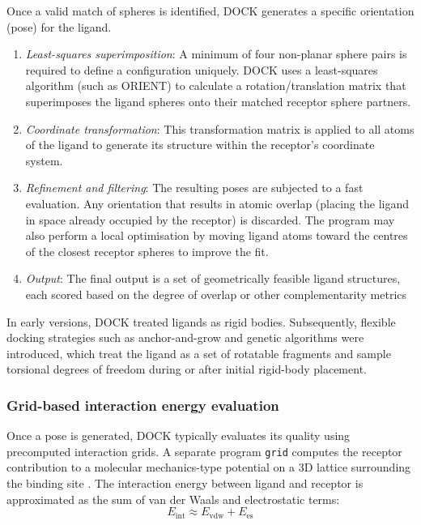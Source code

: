 \documentclass[12pt]{article}
\begin{document}
Once a valid match of spheres is identified, DOCK generates a specific orientation (pose) for the ligand.
\begin{enumerate}
\item \emph{Least-squares superimposition}: A minimum of four non-planar sphere pairs is required to define a configuration uniquely. DOCK uses a least-squares algorithm (such as ORIENT\cite{CH7_ORIENT}) to calculate a rotation/translation matrix that superimposes the ligand spheres onto their matched receptor sphere partners.
\item \emph{Coordinate transformation}: This transformation matrix is applied to all atoms of the ligand to generate its structure within the receptor's coordinate system.
\item \emph{Refinement and filtering}: The resulting poses are subjected to a fast evaluation. Any orientation that results in atomic overlap (placing the ligand in space already occupied by the receptor) is discarded. The program may also perform a local optimisation by moving ligand atoms toward the centres of the closest receptor spheres to improve the fit.
\item \emph{Output}: The final output is a set of geometrically feasible ligand structures, each scored based on the degree of overlap or other complementarity metrics
\end{enumerate}

In early versions, DOCK treated ligands as rigid bodies. Subsequently, flexible docking strategies such as anchor-and-grow and genetic algorithms were introduced, which treat the ligand as a set of rotatable fragments and sample torsional degrees of freedom during or after initial rigid-body placement\cite{CH7_Oshiro1995,CH7_Meng1993Min}.

\subsubsection{Grid-based interaction energy evaluation}

Once a pose is generated, DOCK typically evaluates its quality using precomputed interaction grids. A separate program \verb|grid| computes the receptor contribution to a molecular mechanics-type potential on a 3D lattice surrounding the binding site \cite{CH7_Meng1992Grid}. The interaction energy between ligand and receptor is approximated as the sum of van der Waals and electrostatic terms:
\begin{equation}
  E_{\textrm{int}} \approx E_{\textrm{vdw}} + E_{\textrm{es}}
\end{equation}
\end{document}
